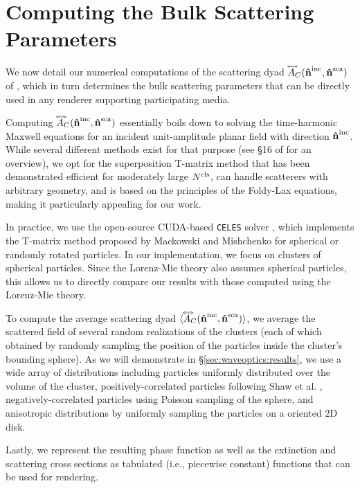 \section{Computing the Bulk Scattering Parameters}
\label{sec:waveoptics:ours_numerical}

We now detail our numerical computations of the scattering dyad $\accentset{\Longleftrightarrow}{A}_C(\mathbf{\hat{n}}^{\text{inc}},\mathbf{\hat{n}}^{\text{sca}})$ of , which in turn determines the bulk scattering parameters that can be directly used in any renderer supporting participating media. 

Computing $\accentset{\Longleftrightarrow}{A}_C(\mathbf{\hat{n}}^{\text{inc}},\mathbf{\hat{n}}^{\text{sca}})$ essentially boils down to solving the time-harmonic Maxwell equations for an incident unit-amplitude planar field with direction $\mathbf{\hat{n}}^{\text{inc}}$. While several different methods exist for that purpose (see \S 16 of \cite{mishchenko2014electromagnetic} for an overview), we opt for the superposition T-matrix method \cite{mackowski1996calculation} that has been demonstrated efficient for moderately large ${N^\text{cls}}$, can handle scatterers with arbitrary geometry, and is based on the principles of the Foldy-Lax equations, making it particularly appealing for our work. 

In practice, we use the open-source CUDA-based \texttt{CELES} solver \cite{egel2017celes}, which implements the T-matrix method proposed by Mackowski and Mishchenko \cite{mackowski2011multiple} for spherical or randomly rotated particles.
In our implementation, we focus on clusters of spherical particles.
Since the Lorenz-Mie theory also assumes spherical particles, this allows us to directly compare our results with those computed using the Lorenz-Mie theory. 

To compute the average scattering dyad ${\langle \accentset{\Longleftrightarrow}{A}_C(\mathbf{\hat{n}}^{\text{inc}},\mathbf{\hat{n}}^{\text{sca}}) \rangle}$, we average the scattered field of several random realizations of the clusters (each of which obtained by randomly sampling the position of the particles inside the cluster's bounding sphere).
As we will demonstrate in \S\ref{sec:waveoptics:results}, we use a wide array of distributions including particles uniformly distributed over the volume of the cluster, positively-correlated particles following Shaw et al. \cite{shaw2002super}, negatively-correlated particles using Poisson sampling of the sphere, and anisotropic distributions by uniformly sampling the particles on a oriented 2D disk.

Lastly, we represent the resulting phase function as well as the extinction and scattering cross sections as tabulated (i.e., piecewise constant) functions that can be used for rendering.
